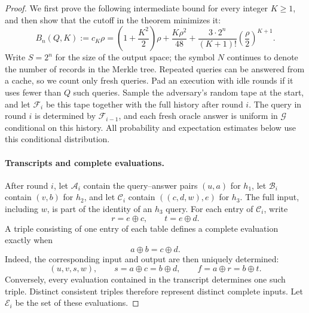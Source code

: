 \documentclass[11pt,letterpaper]{article}
\theoremstyle{definition} %
\begin{document}
\begin{proof}
We first prove the following intermediate bound for every integer
$K\geq1$, and then show that the cutoff in the theorem minimizes it:
\begin{equation}
 B_n(Q,K):=c_K\rho
 =\left(1+\frac{K^2}{2}\right)\rho
  +\frac{K\rho^2}{48}
  +\frac{3\cdot2^n}{(K+1)!}
       \left(\frac{\rho}{2}\right)^{K+1}.
 \label{eq:cutoff-collision-bound}
\end{equation}
Write $S=2^n$ for the size of the output space; the symbol $N$ continues
to denote the number of records in the Merkle tree. Repeated queries can
be answered from a cache, so we count only fresh queries. Pad an execution
with idle rounds if it uses fewer than $Q$ such queries. Sample the
adversary's random tape at the start, and let $\mathcal{F}_i$ be this
tape together with the full history after round $i$. The query in round
$i$ is determined by
$\mathcal{F}_{i-1}$, and each fresh oracle answer is uniform in
$\mathcal{G}$ conditional on this history. All probability and
expectation estimates below use this conditional distribution.

\paragraph{Transcripts and complete evaluations.}
After round $i$, let $\mathcal{A}_i$ contain the query--answer pairs
$(u,a)$ for $h_1$, let $\mathcal{B}_i$ contain $(v,b)$ for $h_2$, and
let $\mathcal{C}_i$ contain $((c,d,w),e)$ for $h_3$. The full input,
including $w$, is part of the identity of an $h_3$ query. For each entry
of $\mathcal{C}_i$, write
\[
 r=e\oplus c,\qquad t=e\oplus d.
\]
A triple consisting of one entry of each table defines a complete
evaluation exactly when
\begin{equation}
 a\oplus b=c\oplus d.
 \label{eq:t5-consistent-triple}
\end{equation}
Indeed, the corresponding input and output are then uniquely determined:
\[
 (u,v,s,w),\qquad s=a\oplus c=b\oplus d,
 \qquad f=a\oplus r=b\oplus t.
\]
Conversely, every evaluation contained in the transcript determines one
such triple. Distinct consistent triples therefore represent distinct
complete inputs. Let $\mathcal{E}_i$ be the set of these evaluations.


\end{proof}
\end{document}
